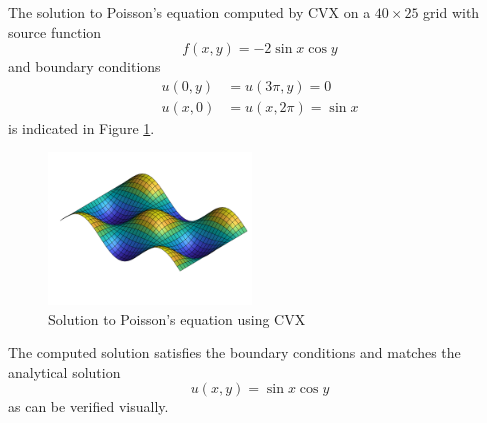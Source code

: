 \documentclass[conference]{IEEEtran}
\begin{document}
The solution to Poisson's equation computed by CVX on a $40 \times 25$ grid with source function
\begin{equation}
  f(x, y) = -2 \sin x \cos y
\end{equation}
and boundary conditions
\begin{align}
  u(0, y) &= u(3\pi, y) = 0 \\
  u(x, 0) &= u(x, 2\pi) = \sin x
\end{align}
is indicated in Figure \ref{fig:poisson-solution}.
\begin{figure}[b]
  \begin{center}
    \includegraphics[width=0.48\textwidth]{poisson-solution}
    \caption{Solution to Poisson's equation using CVX}
    \label{fig:poisson-solution}
  \end{center}
\end{figure}
The computed solution satisfies the boundary conditions and matches the analytical solution
\begin{equation}
  u(x, y) = \sin x \cos y
\end{equation}
as can be verified visually.
\end{document}

